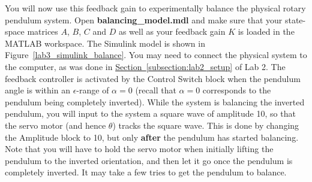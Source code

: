 You will now use this feedback gain to experimentally balance the physical rotary pendulum system. Open \textbf{balancing\_model.mdl} and make sure that your state-space matrices $A$, $B$, $C$ and $D$ as well as your feedback gain $K$ is loaded in the MATLAB workspace. The Simulink model is shown in Figure~\ref{lab3_simulink_balance}. You may need to connect the physical system to the computer, as was done in \hyperref[subsection:lab2_setup]{Section~\ref{subsection:lab2_setup}} of Lab 2. The feedback controller is activated by the Control Switch block when the pendulum angle is within an $\epsilon$-range of $\alpha = 0$ (recall that $\alpha=0$ corresponds to the pendulum being completely inverted). While the system is balancing the inverted pendulum, you will input to the system a square wave of amplitude 10, so that the servo motor (and hence $\theta$) tracks the square wave. This is done by changing the Amplitude block to 10, but only \textbf{after} the pendulum has started balancing. Note that you will have to hold the servo motor when initially lifting the pendulum to the inverted orientation, and then let it go once the pendulum is completely inverted. It may take a few tries to get the pendulum to balance.

